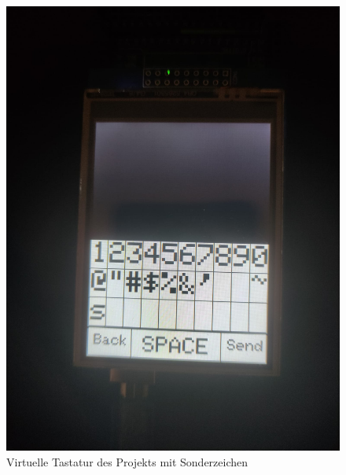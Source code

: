 \documentclass[a4paper, 11pt]{scrartcl}
\begin{document}
\begin{small}
\begin{figure}[H]
    \begin{center}
        \includegraphics[scale=0.13]{Bilder/special_keys.jpeg}
        \caption{Virtuelle Tastatur des Projekts mit Sonderzeichen}\label{pic:keys_special}
    \end{center}
\end{figure}


\end{small}
\end{document}
